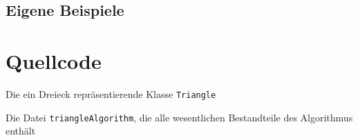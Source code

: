 \documentclass[a4paper, notitlepage, 12pt]{scrartcl}
\newenvironment{longlisting}{\captionsetup{type=listing}}{}
\begin{document}
\subsection{Eigene Beispiele}

 \section{Quellcode}
 \renewcommand{\listingscaption}{Quellcode}
 
 \begin{longlisting}
 	
 	\caption{Die ein Dreieck repräsentierende Klasse \texttt{Triangle}}
 	
 	\caption{Die Datei \texttt{triangleAlgorithm}, die alle wesentlichen Bestandteile des Algorithmus enthält}
 \end{longlisting}
 
 
\end{document}
